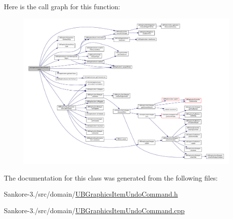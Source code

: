 Here is the call graph for this function\-:
\nopagebreak
\begin{figure}[H]
\begin{center}
\leavevmode
\includegraphics[width=350pt]{d2/df2/class_u_b_graphics_item_undo_command_ad72c268f481bda2170f4b0cafe193bd5_cgraph}
\end{center}
\end{figure}




The documentation for this class was generated from the following files\-:\begin{DoxyCompactItemize}
\item 
Sankore-\/3./src/domain/\hyperlink{_u_b_graphics_item_undo_command_8h}{U\-B\-Graphics\-Item\-Undo\-Command.\-h}\item 
Sankore-\/3./src/domain/\hyperlink{_u_b_graphics_item_undo_command_8cpp}{U\-B\-Graphics\-Item\-Undo\-Command.\-cpp}\end{DoxyCompactItemize}
